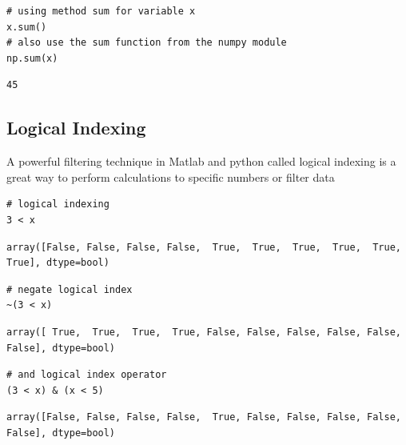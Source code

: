 \documentclass[%
oneside,                 %
final,                   %
10pt]{article}
\begin{document}
\begin{Verbatim}[numbers=none,fontsize=\fontsize{9pt}{9pt},baselinestretch=0.95,xleftmargin=2mm]
# using method sum for variable x
x.sum()
# also use the sum function from the numpy module
np.sum(x)
\end{Verbatim}

\begin{Verbatim}[numbers=none,fontsize=\fontsize{9pt}{9pt},baselinestretch=0.95,xleftmargin=2mm]
45
\end{Verbatim}


\subsection{Logical Indexing}

A powerful filtering technique in Matlab and python called logical indexing is a great way to perform calculations to specific numbers or filter data

\begin{Verbatim}[numbers=none,fontsize=\fontsize{9pt}{9pt},baselinestretch=0.95,xleftmargin=2mm]
# logical indexing
3 < x
\end{Verbatim}

\begin{Verbatim}[numbers=none,fontsize=\fontsize{9pt}{9pt},baselinestretch=0.95,xleftmargin=2mm]
array([False, False, False, False,  True,  True,  True,  True,  True,  True], dtype=bool)
\end{Verbatim}

\begin{Verbatim}[numbers=none,fontsize=\fontsize{9pt}{9pt},baselinestretch=0.95,xleftmargin=2mm]
# negate logical index
~(3 < x)
\end{Verbatim}

\begin{Verbatim}[numbers=none,fontsize=\fontsize{9pt}{9pt},baselinestretch=0.95,xleftmargin=2mm]
array([ True,  True,  True,  True, False, False, False, False, False, False], dtype=bool)
\end{Verbatim}

\begin{Verbatim}[numbers=none,fontsize=\fontsize{9pt}{9pt},baselinestretch=0.95,xleftmargin=2mm]
# and logical index operator
(3 < x) & (x < 5)
\end{Verbatim}

\begin{Verbatim}[numbers=none,fontsize=\fontsize{9pt}{9pt},baselinestretch=0.95,xleftmargin=2mm]
array([False, False, False, False,  True, False, False, False, False, False], dtype=bool)
\end{Verbatim}
\end{document}
